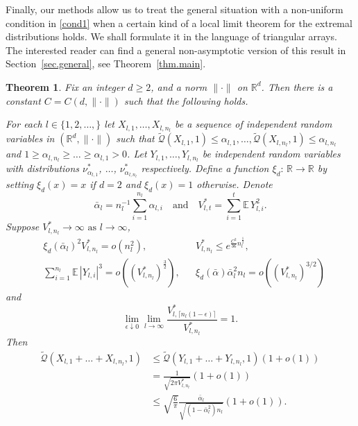\documentclass{article}
\newtheorem{theorem}{Theorem}[section]
\def\E{{\mathbb E}\,}
\newcommand{\concdiam}{\tilde{\mathcal{Q}}}
\newcommand\nuopt[1]{\nu_{#1}^*}
\begin{document}
Finally, our methods allow us to treat the general situation with a non-uniform condition in \eqref{cond1} when a certain kind of a local limit theorem for the extremal distributions holds.
We shall formulate it in the language of triangular arrays. 
The interested reader can find a general non-asymptotic version of this result in Section~\ref{sec.general}, see Theorem~\ref{thm.main}.
\begin{theorem}\label{local}
    Fix an integer $d \ge 2$, and a norm $\|\cdot\|$ on $\mathbb{R}^d$. Then there is a constant $C = C(d, \|\cdot\|)$ such that the following holds.

    For each $l \in \{1,2,\dots,\}$ let  $X_{l, 1}, \dots, X_{l, n_l}$
    be a sequence of independent random variables in $(\mathbb{R}^d, \|\cdot\|)$ such that $\concdiam(X_{l, 1}, 1) \le \alpha_{l, 1}, \dots, \concdiam(X_{l, n_l}, 1) \le \alpha_{l, n_l}$ and  $1 \ge \alpha_{l,n_l} \ge \dots \ge \alpha_{l, 1} > 0$.
    Let $Y_{l, 1}, \dots, Y_{l, n_l}$ be independent random variables with distributions $\nuopt {\alpha_{l, 1}}$, $\dots$, $\nuopt {\alpha_{l, n_l}}$ respectively.
    Define a function $\xi_{d}:\, \mathbb{R}\rightarrow \mathbb{R}$ by setting $\xi_{d}(x)=x$ if $d=2$ and $\xi_{d}(x)=1$ otherwise. Denote
    \[
        \bar{\alpha}_l = n_l^{-1} \sum_{i=1}^{n_l} \alpha_{l, i} \quad \mbox{and}\quad V^*_{l, t} = \sum_{i=1}^{t} \E Y_{l, i}^2.
    \]
    Suppose  $V^*_{l, n_l} \to \infty \mbox{ as }l\to \infty$, 
    \begin{align*}
&\xi_d(\bar{\alpha}_l)^2 V^*_{l, n_l} = o(n_l^2),
& &V^*_{l, n_l} \le e^{\frac {C^2} {36} n_l^{\frac 1 2}},
\\
        &  \sum_{i=1}^{n_l} \E |Y_{l, i}|^3 = o( (V^*_{l, n_l})^{\frac 3 2}), 
& &
        \xi_d(\bar{\alpha}) \bar{\alpha}_l^2 n_l = o((V^*_{l, n_l})^{3/2})
    \end{align*}
    and
    \[
        \lim_{\epsilon \downarrow 0} \lim_{l \to \infty} \frac {V^*_{l, \lceil n_l (1-\epsilon) \rceil}}{V^*_{l,n_l}} = 1.
    \]
    Then
    \begin{align}
        \concdiam(X_{l, 1} + \dots + X_{l, n_l}, 1)  & \le \concdiam(Y_{l, 1} + \dots + Y_{l, n_l}, 1) (1 + o(1))  \nonumber
        \\ & = \frac 1 {\sqrt{2 \pi V^*_{l, n_l}}} (1 + o(1)) \label{eq.sharpb}
      \\  &\le 
        \sqrt {\frac 6 \pi}  \frac {\bar{\alpha}_l} {\sqrt{ (1 - \bar{\alpha}_l^2) n_l}} (1 + o(1)). \label{eq.crudeb}
    \end{align}


\end{theorem}
\end{document}
